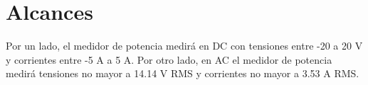 \section{Alcances}
Por un lado, el medidor de potencia medirá en DC con tensiones entre -20 a 20 V y corrientes entre -5 A a 5 A.
Por otro lado, en AC el medidor de potencia medirá tensiones no mayor a  14.14 V RMS y corrientes no mayor a  3.53 A RMS.
